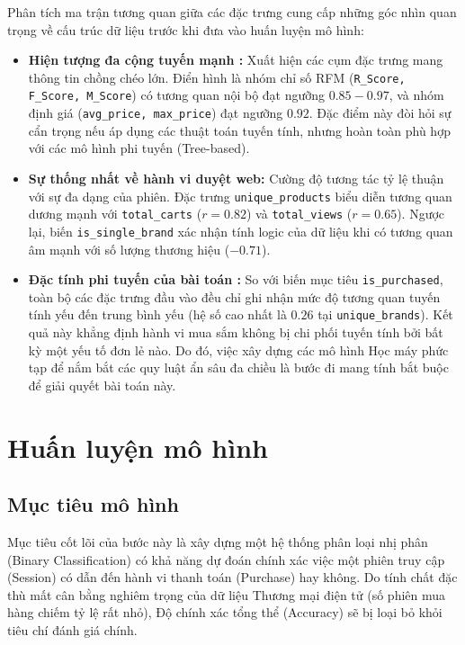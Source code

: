 \documentclass[a4paper,11pt]{article}
\begin{document}
Phân tích ma trận tương quan giữa các đặc trưng cung cấp những góc nhìn quan trọng về cấu trúc dữ liệu trước khi đưa vào huấn luyện mô hình:
\begin{itemize}
    \item \textbf{Hiện tượng đa cộng tuyến mạnh :} Xuất hiện các cụm đặc trưng mang thông tin chồng chéo lớn. Điển hình là nhóm chỉ số RFM (\texttt{R\_Score, F\_Score, M\_Score}) có tương quan nội bộ đạt ngưỡng $0.85 - 0.97$, và nhóm định giá (\texttt{avg\_price, max\_price}) đạt ngưỡng $0.92$. Đặc điểm này đòi hỏi sự cẩn trọng nếu áp dụng các thuật toán tuyến tính, nhưng hoàn toàn phù hợp với các mô hình phi tuyến (Tree-based).
    
    \item \textbf{Sự thống nhất về hành vi duyệt web:} Cường độ tương tác tỷ lệ thuận với sự đa dạng của phiên. Đặc trưng \texttt{unique\_products} biểu diễn tương quan dương mạnh với \texttt{total\_carts} ($r = 0.82$) và \texttt{total\_views} ($r = 0.65$). Ngược lại, biến \texttt{is\_single\_brand} xác nhận tính logic của dữ liệu khi có tương quan âm mạnh với số lượng thương hiệu ($-0.71$).
    
    \item \textbf{Đặc tính phi tuyến của bài toán :} So với biến mục tiêu \texttt{is\_purchased}, toàn bộ các đặc trưng đầu vào đều chỉ ghi nhận mức độ tương quan tuyến tính yếu đến trung bình yếu (hệ số cao nhất là $0.26$ tại \texttt{unique\_brands}). Kết quả này khẳng định hành vi mua sắm không bị chi phối tuyến tính bởi bất kỳ một yếu tố đơn lẻ nào. Do đó, việc xây dựng các mô hình Học máy phức tạp để nắm bắt các quy luật ẩn sâu đa chiều là bước đi mang tính bắt buộc để giải quyết bài toán này.
\end{itemize}

\section{Huấn luyện mô hình}
\subsection{Mục tiêu mô hình}
Mục tiêu cốt lõi của bước này là xây dựng một hệ thống phân loại nhị phân (Binary Classification) có khả năng dự đoán chính xác việc một phiên truy cập (Session) có dẫn đến hành vi thanh toán (Purchase) hay không. Do tính chất đặc thù mất cân bằng nghiêm trọng của dữ liệu Thương mại điện tử (số phiên mua hàng chiếm tỷ lệ rất nhỏ), Độ chính xác tổng thể (Accuracy) sẽ bị loại bỏ khỏi tiêu chí đánh giá chính. 
\end{document}
